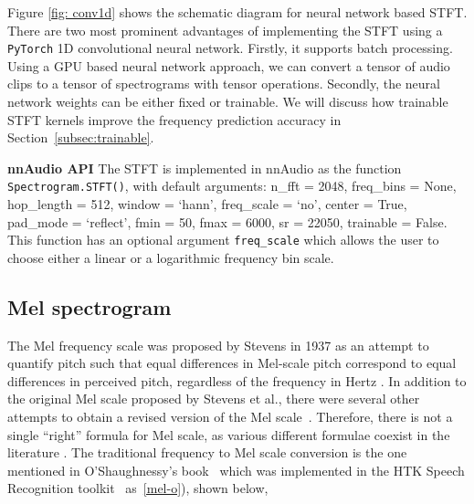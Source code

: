 \documentclass{ieeeaccess}
\newcommand{\nbh}[1]{\texttt{#1}}
\begin{document}
Figure \ref{fig: conv1d} shows the schematic diagram for neural network based STFT. There are two most prominent advantages of implementing the STFT using a \nbh{PyTorch} 1D convolutional neural network. Firstly, it supports batch processing. Using a GPU based neural network approach, we can convert a tensor of audio clips to a tensor of spectrograms with tensor operations. Secondly, the neural network weights can be either fixed or trainable. We will discuss how trainable STFT kernels improve the frequency prediction accuracy in Section~\ref{subsec:trainable}. 

\hspace{11pt} 

\noindent \textbf{nnAudio API} The STFT is implemented in nnAudio as the function \nbh{Spectrogram.STFT()}, with default arguments: n\_fft = 2048, freq\_bins = None, hop\_length = 512, window = `hann', freq\_scale = `no', center = True, pad\_mode = `reflect', fmin = 50, fmax = 6000, sr = 22050, trainable = False. This function has an optional argument \nbh{freq\_scale} which allows the user to choose either a linear or a logarithmic frequency bin scale.



\subsection{Mel spectrogram}
The Mel frequency scale was proposed by Stevens in 1937 as an attempt to quantify pitch such that equal differences in Mel-scale pitch correspond to equal differences in perceived pitch, regardless of the frequency in Hertz \cite{Stevens1937ASF}. 
In addition to the original Mel scale proposed by Stevens et al., there were several other attempts to obtain a revised version of the Mel scale~\cite{Stevens1940TheRO, fant1949analys, koening1949new}. Therefore, there is not a single ``right'' formula for Mel scale, as various different formulae coexist in the literature \cite{umesh1999fitting}.  The traditional frequency to Mel scale conversion is the one mentioned in O'Shaughnessy's book~\cite{o1987speech} which was implemented in the HTK Speech Recognition toolkit~\cite{young2002htk} as~\eqref{mel-o}), shown below,
\end{document}
